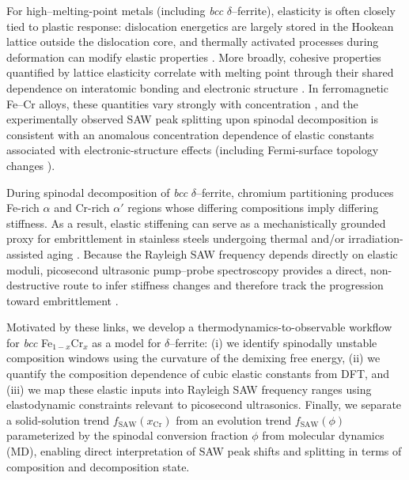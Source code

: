 \documentclass[final,3p,times]{elsarticle}
\begin{document}
For high--melting-point metals (including \textit{bcc} $\delta$--ferrite), elasticity is often closely tied to plastic response: dislocation energetics are largely stored in the Hookean lattice outside the dislocation core, and thermally activated processes during deformation can modify elastic properties \cite{pugh1954xcii}.  
More broadly, cohesive properties quantified by lattice elasticity correlate with melting point through their shared dependence on interatomic bonding and electronic structure \cite{chang1966correlation,fine1984elastic, korzhavyi2009electronic, razumovskiy2011first, hosemann2018materials}. 
In ferromagnetic Fe--Cr alloys, these quantities vary strongly with concentration \cite{korzhavyi2009electronic}, and the experimentally observed SAW peak splitting upon spinodal decomposition is consistent with an anomalous concentration dependence of elastic constants associated with electronic-structure effects (including Fermi-surface topology changes \cite{razumovskiy2011first}). 

During spinodal decomposition of \textit{bcc} $\delta$--ferrite, chromium partitioning produces Fe-rich $\alpha$ and Cr-rich $\alpha'$ regions whose differing compositions imply differing stiffness. As a result, elastic stiffening can serve as a mechanistically grounded proxy for embrittlement in stainless steels undergoing thermal and/or irradiation-assisted aging \cite{du2017facile, sdajani2019cassspinodal,al2020non, hofmann2019transient, al2020detecting,byun2016thermal,lach2020precipitation}. 
Because the Rayleigh SAW frequency depends directly on elastic moduli, picosecond ultrasonic pump--probe spectroscopy provides a direct, non-destructive route to infer stiffness changes and therefore track the progression toward embrittlement \cite{hofmann2019transient}.

Motivated by these links, we develop a thermodynamics-to-observable workflow for \textit{bcc} Fe$_{1-x}$Cr$_x$ as a model for $\delta$--ferrite: (i) we identify spinodally unstable composition windows using the curvature of the demixing free energy, (ii) we quantify the composition dependence of cubic elastic constants from DFT, and (iii) we map these elastic inputs into Rayleigh SAW frequency ranges using elastodynamic constraints relevant to picosecond ultrasonics. Finally, we separate a solid-solution trend $f_{\mathrm{SAW}}(x_{\mathrm{Cr}})$ from an evolution trend $f_{\mathrm{SAW}}(\phi)$ parameterized by the spinodal conversion fraction $\phi$ from molecular dynamics (MD), enabling direct interpretation of SAW peak shifts and splitting in terms of composition and decomposition state.
\end{document}
